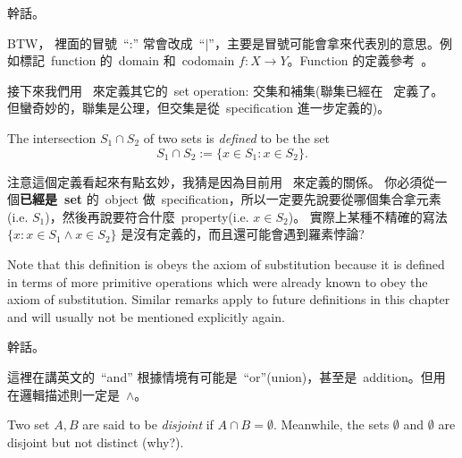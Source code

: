 \begin{example}
幹話。
\end{example}


\begin{note}
BTW， 裡面的冒號\ ``:'' 常會改成\  ``\(\mid\)''，主要是冒號可能會拿來代表別的意思。例如標記\ function 的\ domain 和\ codomain \(f : X \xrightarrow{} Y\)。Function 的定義參考\ 。
\end{note}

\begin{note}
接下來我們用\  來定義其它的\ set operation: 交集和補集(聯集已經在\  定義了。
但蠻奇妙的，聯集是公理，但交集是從\ specification 進一步定義的)。
\end{note}

\begin{definition} [Intersections] \label{def 3.1.23}
The intersection \(S_1 \cap S_2 \) of two sets is \emph{defined} to be the set
\[
    S_1 \cap S_2 := \{ x \in S_1 : x \in S_2 \}.
\]
\end{definition}

\begin{note}
注意這個定義看起來有點玄妙，我猜是因為目前用\  來定義的關係。
你必須從一個\textbf{已經是\ set} 的\ object 做\ specification，所以一定要先說要從哪個集合拿元素(i.e. \(S_1\))，然後再說要符合什麼\ property(i.e. \(x \in S_2\))。
實際上某種不精確的寫法\ \( \{ x : x \in S_1 \land x \in S_2 \} \) 是沒有定義的，而且還可能會遇到羅素悖論?
\end{note}

\begin{remark} \label{remark 3.1.24}
Note that this definition is obeys the axiom of substitution  because it is defined in terms of more primitive operations which were already known to obey the axiom of substitution.
Similar remarks apply to future definitions in this chapter and will usually not be mentioned explicitly again.
\end{remark}

\begin{example}
幹話。
\end{example}

\begin{remark} \label{remark 3.1.26}
這裡在講英文的\ ``and'' 根據情境有可能是\ ``or''(union)，甚至是\ addition。但用在邏輯描述則一定是\ \(\land\)。
\end{remark}

\begin{note}
Two set \(A, B\) are said to be \emph{disjoint} if \(A \cap B = \emptyset\).
Meanwhile, the sets \(\emptyset\) and \(\emptyset\) are disjoint but not distinct (why?).
\end{note}

